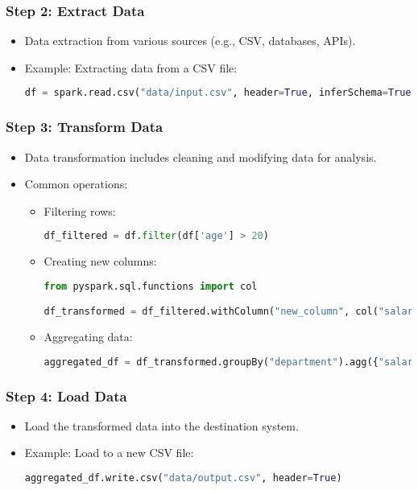 \documentclass[aspectratio=169]{beamer}
\begin{document}
\begin{frame}[fragile]
    \frametitle{Step 2: Extract Data}
    \begin{itemize}
        \item Data extraction from various sources (e.g., CSV, databases, APIs).
        \item Example: Extracting data from a CSV file:
        \begin{lstlisting}[language=python]
df = spark.read.csv("data/input.csv", header=True, inferSchema=True)
        \end{lstlisting}
    \end{itemize}
\end{frame}

\begin{frame}[fragile]
    \frametitle{Step 3: Transform Data}
    \begin{itemize}
        \item Data transformation includes cleaning and modifying data for analysis.
        \item Common operations:
        \begin{itemize}
            \item Filtering rows:
            \begin{lstlisting}[language=python]
df_filtered = df.filter(df['age'] > 20)
            \end{lstlisting}
            \item Creating new columns:
            \begin{lstlisting}[language=python]
from pyspark.sql.functions import col

df_transformed = df_filtered.withColumn("new_column", col("salary") * 1.1)
            \end{lstlisting}
            \item Aggregating data:
            \begin{lstlisting}[language=python]
aggregated_df = df_transformed.groupBy("department").agg({"salary": "avg"})
            \end{lstlisting}
        \end{itemize}
    \end{itemize}
\end{frame}

\begin{frame}[fragile]
    \frametitle{Step 4: Load Data}
    \begin{itemize}
        \item Load the transformed data into the destination system.
        \item Example: Load to a new CSV file:
        \begin{lstlisting}[language=python]
aggregated_df.write.csv("data/output.csv", header=True)
        \end{lstlisting}
    \end{itemize}
\end{frame}
\end{document}
